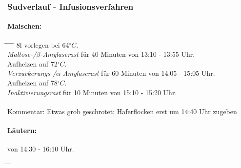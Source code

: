 \documentclass[12pt,oneside,a4paper]{scrartcl}
\begin{document}
\subsubsection*{Sudverlauf - Infusionsverfahren}	
%
\paragraph{Maischen:}
	\begin{tabbing}
		\hspace{1cm} \= \hspace{1cm} \= \hspace{1cm} \= \hspace{1cm} \= \kill
		\> 8l vorlegen bei 64$^\circ C$.\\
		\> \textit{Maltose-/$\beta$-Amylaserast} für 40 Minuten von 13:10 - 13:55 Uhr.\\
		\> \> Aufheizen auf 72$^\circ C$.\\
		\> \textit{Verzuckerungs-/$\alpha$-Amylaserast} für 60 Minuten von 14:05 - 15:05 Uhr.\\
		\> \> Aufheizen auf 78$^\circ C$.\\
		\> \textit{Inaktivierungsrast} für 10 Minuten von 15:10 - 15:20 Uhr.\\\\
		\> Kommentar: \>\>\> Etwas grob geschrotet; Haferflocken erst um 14:40 Uhr zugeben
	\end{tabbing}
%
\paragraph{Läutern:} von 14:30 - 16:10 Uhr.
	\begin{tabbing}
		\hspace{1cm} \= \hspace{1cm} \= \hspace{1cm} \= \kill
		\>
	\end{tabbing}
\end{document}
